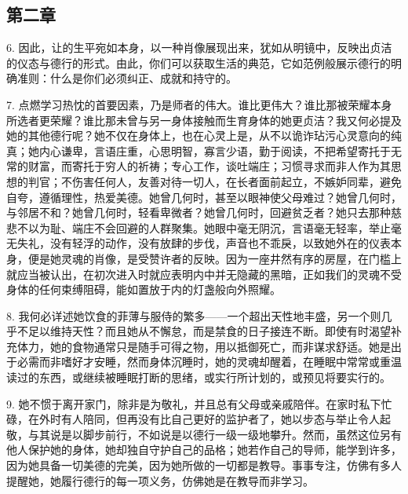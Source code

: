 
\subsection{第二章}

\par

6. 因此，让的生平宛如本身，以一种肖像展现出来，犹如从明镜中，反映出贞洁的仪态与德行的形式。由此，你们可以获取生活的典范，它如范例般展示德行的明确准则：什么是你们必须纠正、成就和持守的。\par

7. 点燃学习热忱的首要因素，乃是师者的伟大。谁比更伟大？谁比那被荣耀本身所选者更荣耀？谁比那未曾与另一身体接触而生育身体的她更贞洁？我又何必提及她的其他德行呢？她不仅在身体上，也在心灵上是，从不以诡诈玷污心灵意向的纯真；她内心谦卑，言语庄重，心思明智，寡言少语，勤于阅读，不把希望寄托于无常的财富，而寄托于穷人的祈祷；专心工作，谈吐端庄；习惯寻求而非人作为其思想的判官；不伤害任何人，友善对待一切人，在长者面前起立，不嫉妒同辈，避免自夸，遵循理性，热爱美德。她曾几何时，甚至以眼神使父母难过？她曾几何时，与邻居不和？她曾几何时，轻看卑微者？她曾几何时，回避贫乏者？她只去那种慈悲不以为耻、端庄不会回避的人群聚集。她眼中毫无阴沉，言语毫无轻率，举止毫无失礼，没有轻浮的动作，没有放肆的步伐，声音也不乖戾，以致她外在的仪表本身，便是她灵魂的肖像，是受赞许者的反映。因为一座井然有序的房屋，在门槛上就应当被认出，在初次进入时就应表明内中并无隐藏的黑暗，正如我们的灵魂不受身体的任何束缚阻碍，能如置放于内的灯盏般向外照耀。\par

8. 我何必详述她饮食的菲薄与服侍的繁多——一个超出天性地丰盛，另一个则几乎不足以维持天性？而且她从不懈怠，而是禁食的日子接连不断。即使有时渴望补充体力，她的食物通常只是随手可得之物，用以抵御死亡，而非谋求舒适。她是出于必需而非嗜好才安睡，然而身体沉睡时，她的灵魂却醒着，在睡眠中常常或重温读过的东西，或继续被睡眠打断的思绪，或实行所计划的，或预见将要实行的。\par

9. 她不惯于离开家门，除非是为敬礼，并且总有父母或亲戚陪伴。在家时私下忙碌，在外时有人陪同，但再没有比自己更好的监护者了，她以步态与举止令人起敬，与其说是以脚步前行，不如说是以德行一级一级地攀升。然而，虽然这位另有他人保护她的身体，她却独自守护自己的品格；她若作自己的导师，能学到许多，因为她具备一切美德的完美，因为她所做的一切都是教导。事事专注，仿佛有多人提醒她，她履行德行的每一项义务，仿佛她是在教导而非学习。\par


